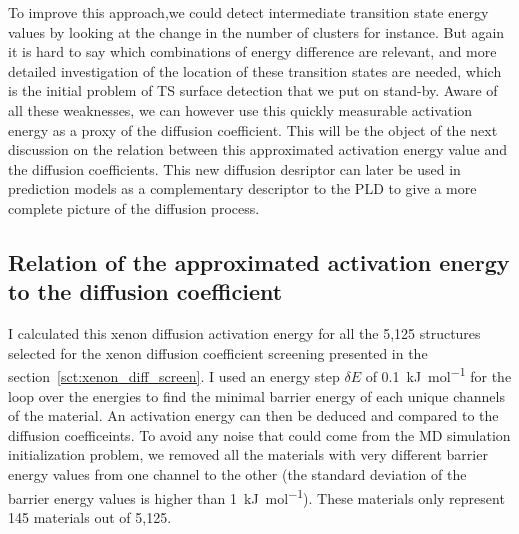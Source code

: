 \documentclass[main]{subfiles}
\begin{document}
To improve this approach,we could detect intermediate transition state energy values by looking at the change in the number of clusters for instance. But again it is hard to say which combinations of energy difference are relevant, and more detailed investigation of the location of these transition states are needed, which is the initial problem of TS surface detection that we put on stand-by. Aware of all these weaknesses, we can however use this quickly measurable activation energy as a proxy of the diffusion coefficient. 
This will be the object of the next discussion on the relation between this approximated activation energy value and the diffusion coefficients. This new diffusion desriptor can later be used in prediction models as a complementary descriptor to the PLD to give a more complete picture of the diffusion process. 

\subsection{Relation of the approximated activation energy to the diffusion coefficient}

I calculated this xenon diffusion activation energy for all the 5,125 structures selected for the xenon diffusion coefficient screening presented in the section~\ref{sct:xenon_diff_screen}. I used an energy step $\delta E$ of \SI{0.1}{\kJ\per\mol} for the loop over the energies to find the minimal barrier energy of each unique channels of the material. An activation energy can then be deduced and compared to the diffusion coefficeints. To avoid any noise that could come from the MD simulation initialization problem, we removed all the materials with very different barrier energy values from one channel to the other (the standard deviation of the barrier energy values is higher than \SI{1}{\kJ\per\mol}). These materials only represent 145 materials out of 5,125.
\end{document}
